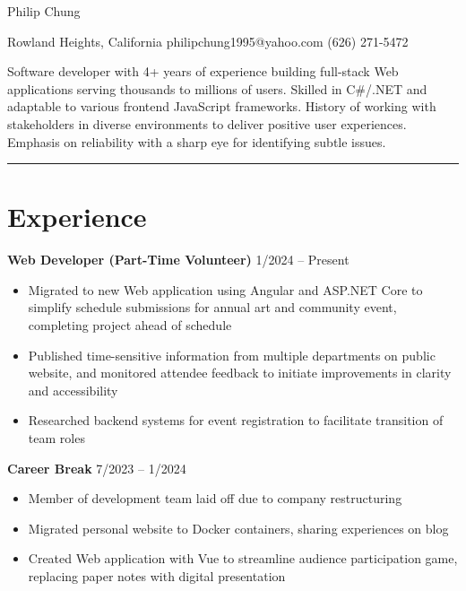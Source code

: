 \documentclass[12pt]{article}
\newcommand{\primaryheader}[4]{
	\textbf{#1}
	\ifthenelse{\equal{#3}{}}{}{%
		\symbol{"B7} #3 \ifthenelse{\equal{#4}{}}{}{(#4)}
	}
	\hfill #2%
}
\begin{document}
	{\centering

		{\headerfont\fontsize{24pt}{24pt}\selectfont Philip Chung}

		\vspace{0.25em}

		{\fontsize{10pt}{10pt}\selectfont Rowland Heights, California  philipchung1995@yahoo.com  (626) 271-5472}

	}

	\vspace{0.25em}

	{\fontsize{11pt}{14pt}\selectfont

		Software developer with 4+ years of experience building full-stack Web applications serving thousands to millions of users. Skilled in C\#/.NET and adaptable to various frontend JavaScript frameworks. History of working with stakeholders in diverse environments to deliver positive user experiences. Emphasis on reliability with a sharp eye for identifying subtle issues.

	}

	\rule{\textwidth}{1pt}

	\section*{Experience}

	\primaryheader{Web Developer (Part-Time Volunteer)}{1/2024 -- Present}{PNW}{Remote}

	\begin{itemize}
		\item Migrated to new Web application using Angular and ASP.NET Core to simplify schedule submissions for annual art and community event, completing project ahead of schedule
		\item Published time-sensitive information from multiple departments on public website, and monitored attendee feedback to initiate improvements in clarity and accessibility
		\item Researched backend systems for event registration to facilitate transition of team roles
	\end{itemize}

	\primaryheader{Career Break}{7/2023 -- 1/2024}{}{}

	\begin{itemize}
		\item Member of development team laid off due to company restructuring
		\item Migrated personal website to Docker containers, sharing experiences on blog
		\item Created Web application with Vue to streamline audience participation game, replacing paper notes with digital presentation
	\end{itemize}
\end{document}

